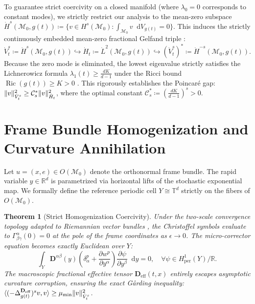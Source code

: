 \documentclass[11pt,a4paper]{article}
\newcommand*{\diff}{\mathop{}\!\mathrm{d}}
\newcommand*{\R}{\mathbb{R}}
\newcommand*{\M}{\mathcal{M}}
\DeclarePairedDelimiter{\norm}{\lVert}{\rVert}
\DeclarePairedDelimiter{\inner}{\langle}{\rangle}
\DeclareMathOperator{\Ric}{Ric}
\theoremstyle{plain}
\newtheorem{theorem}{Theorem}[section]
\theoremstyle{definition}
\theoremstyle{remark}
\begin{document}
To guarantee strict coercivity on a closed manifold (where $\lambda_0 = 0$ corresponds to constant modes), we strictly restrict our analysis to the mean-zero subspace $\dot{H}^s(\M_0, g(t)) \coloneqq \{ v \in H^s(\M_0) : \int_{\M_0} v \diff V_{g(t)} = 0 \}$. This induces the strictly continuously embedded mean-zero fractional Gelfand triple \cite{Lions1972}:
\begin{equation}
    \dot{V}_t^s \coloneqq \dot{H}^s(\M_0, g(t)) \hookrightarrow \dot{H}_t \coloneqq \dot{L}^2(\M_0, g(t)) \hookrightarrow (\dot{V}_t^s)^* \coloneqq \dot{H}^{-s}(\M_0, g(t)).
\end{equation}
Because the zero mode is eliminated, the lowest eigenvalue strictly satisfies the Lichnerowicz formula $\lambda_1(t) \ge \frac{d K}{d-1}$ under the Ricci bound $\Ric(g(t)) \ge K > 0$ \cite{Aubin1982}. This rigorously establishes the Poincar\'{e} gap: $\norm{v}_{\dot{V}_t^s}^2 \ge \mathcal{C}_s^* \norm{v}_{\dot{H}_t}^2$, where the optimal constant $\mathcal{C}_s^* \coloneqq (\frac{d K}{d-1})^s > 0$.

\section{Frame Bundle Homogenization and Curvature Annihilation}
Let $u = (x, e) \in O(\M_0)$ denote the orthonormal frame bundle. The rapid variable $y \in \R^d$ is parametrized via horizontal lifts of the stochastic exponential map. We formally define the reference periodic cell $Y \cong \mathbb{T}^d$ strictly on the fibers of $O(\M_0)$.

\begin{theorem}[Strict Homogenization Coercivity]
Under the two-scale convergence topology adapted to Riemannian vector bundles \cite{Hsu2002}, the Christoffel symbols evaluate to $\Gamma_{\beta \gamma}^\alpha(0) = 0$ at the pole of the frame coordinates as $\epsilon \to 0$. The micro-corrector equation becomes exactly Euclidean over $Y$:
\begin{equation}
    \int_{Y} \mathbf{D}^{\alpha \beta}(y) \left( \delta_\alpha^p + \frac{\partial w^p}{\partial y^\alpha} \right) \frac{\partial \psi}{\partial y^\beta} \diff y = 0, \quad \forall \psi \in H_{\mathrm{per}}^1(Y)/\R.
\end{equation}
The macroscopic fractional effective tensor $\mathbf{D}_{\mathrm{eff}}(t,x)$ entirely escapes asymptotic curvature corruption, ensuring the exact G\r{a}rding inequality: $\inner{(-\Delta_{g(t)}^{\mathbf{D}_{\mathrm{eff}}})^s v, v} \ge \mu_{\min} \norm{v}_{\dot{V}_t^s}^2$.
\end{theorem}
\end{document}

